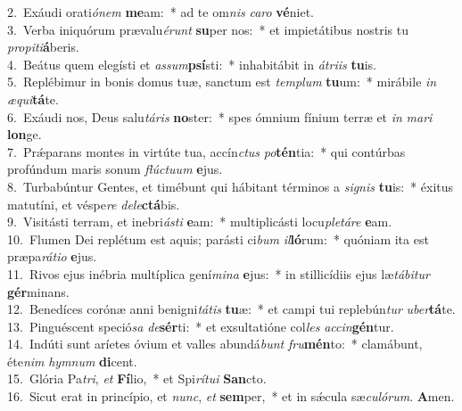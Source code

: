 {2.~}Exáudi orati\textit{ó}\textit{nem} \textbf{me}am:~* ad te om\textit{nis} \textit{ca}\textit{ro} \textbf{vé}niet.\\
{3.~}Verba iniquórum prævalu\textit{é}\textit{runt} \textbf{su}per nos:~* et impietátibus nostris tu \textit{pro}\textit{pi}\textit{ti}\textbf{á}beris.\\
{4.~}Beátus quem elegísti et \textit{as}\textit{sum}\textbf{psí}sti:~* inhabitábit in \textit{á}\textit{tri}\textit{is} \textbf{tu}is.\\
{5.~}Replébimur in bonis domus tuæ, sanctum est \textit{tem}\textit{plum} \textbf{tu}um:~* mirábile \textit{in} \textit{æ}\textit{qui}\textbf{tá}te.\\
{6.~}Exáudi nos, Deus salu\textit{tá}\textit{ris} \textbf{no}ster:~* spes ómnium fínium terræ et \textit{in} \textit{ma}\textit{ri} \textbf{lon}ge.\\
{7.~}Prǽparans montes in virtúte tua, accín\textit{ctus} \textit{po}\textbf{tén}tia:~* qui contúrbas profúndum maris sonum \textit{flú}\textit{ctu}\textit{um} \textbf{e}jus.\\
{8.~}Turbabúntur Gentes, et timébunt qui hábitant términos a \textit{si}\textit{gnis} \textbf{tu}is:~* éxitus matutíni, et véspe\textit{re} \textit{de}\textit{le}\textbf{ctá}bis.\\
{9.~}Visitásti terram, et inebri\textit{á}\textit{sti} \textbf{e}am:~* multiplicásti locu\textit{ple}\textit{tá}\textit{re} \textbf{e}am.\\
{10.~}Flumen Dei replétum est aquis; parásti ci\textit{bum} \textit{il}\textbf{ló}rum:~* quóniam ita est præpa\textit{rá}\textit{ti}\textit{o} \textbf{e}jus.\\
{11.~}Rivos ejus inébria multíplica gení\textit{mi}\textit{na} \textbf{e}jus:~* in stillicídiis ejus læ\textit{tá}\textit{bi}\textit{tur} \textbf{gér}minans.\\
{12.~}Benedíces corónæ anni benigni\textit{tá}\textit{tis} \textbf{tu}æ:~* et campi tui replebún\textit{tur} \textit{u}\textit{ber}\textbf{tá}te.\\
{13.~}Pinguéscent speció\textit{sa} \textit{de}\textbf{sér}ti:~* et exsultatióne col\textit{les} \textit{ac}\textit{cin}\textbf{gén}tur.\\
{14.~}Indúti sunt aríetes óvium et valles abundá\textit{bunt} \textit{fru}\textbf{mén}to:~* clamábunt, éte\textit{nim} \textit{hym}\textit{num} \textbf{di}cent.\\
{15.~}Glória Pa\textit{tri}, \textit{et} \textbf{Fí}lio,~* et Spi\textit{rí}\textit{tu}\textit{i} \textbf{San}cto.\\
{16.~}Sicut erat in princípio, et \textit{nunc}, \textit{et} \textbf{sem}per,~* et in sǽcula sæ\textit{cu}\textit{ló}\textit{rum}. \textbf{A}men.\\
